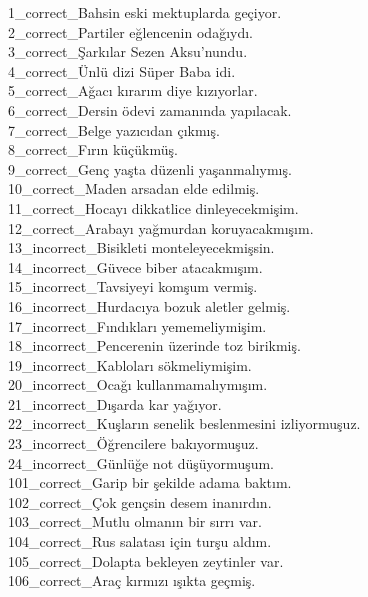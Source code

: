 \begin{myparindent}{0pt}
1\_correct\_Bahsin eski mektuplarda geçiyor. \\
2\_correct\_Partiler eğlencenin odağıydı. \\
3\_correct\_Şarkılar Sezen Aksu'nundu. \\
4\_correct\_Ünlü dizi Süper Baba idi. \\
5\_correct\_Ağacı kırarım diye kızıyorlar. \\
6\_correct\_Dersin ödevi zamanında yapılacak. \\
7\_correct\_Belge yazıcıdan çıkmış. \\
8\_correct\_Fırın küçükmüş. \\
9\_correct\_Genç yaşta düzenli yaşanmalıymış. \\
10\_correct\_Maden arsadan elde edilmiş. \\
11\_correct\_Hocayı dikkatlice dinleyecekmişim. \\
12\_correct\_Arabayı yağmurdan koruyacakmışım. \\
13\_incorrect\_Bisikleti monteleyecekmişsin. \\
14\_incorrect\_Güvece biber atacakmışım. \\
15\_incorrect\_Tavsiyeyi komşum vermiş. \\
16\_incorrect\_Hurdacıya bozuk aletler gelmiş. \\
17\_incorrect\_Fındıkları yememeliymişim. \\
18\_incorrect\_Pencerenin üzerinde toz birikmiş. \\
19\_incorrect\_Kabloları sökmeliymişim. \\
20\_incorrect\_Ocağı kullanmamalıymışım. \\
21\_incorrect\_Dışarda kar yağıyor. \\
22\_incorrect\_Kuşların senelik beslenmesini izliyormuşuz. \\
23\_incorrect\_Öğrencilere bakıyormuşuz. \\
24\_incorrect\_Günlüğe not düşüyormuşum. \\
101\_correct\_Garip bir şekilde adama baktım. \\
102\_correct\_Çok gençsin desem inanırdın. \\
103\_correct\_Mutlu olmanın bir sırrı var. \\
104\_correct\_Rus salatası için turşu aldım. \\
105\_correct\_Dolapta bekleyen zeytinler var. \\
106\_correct\_Araç kırmızı ışıkta geçmiş. \\

\end{myparindent}
